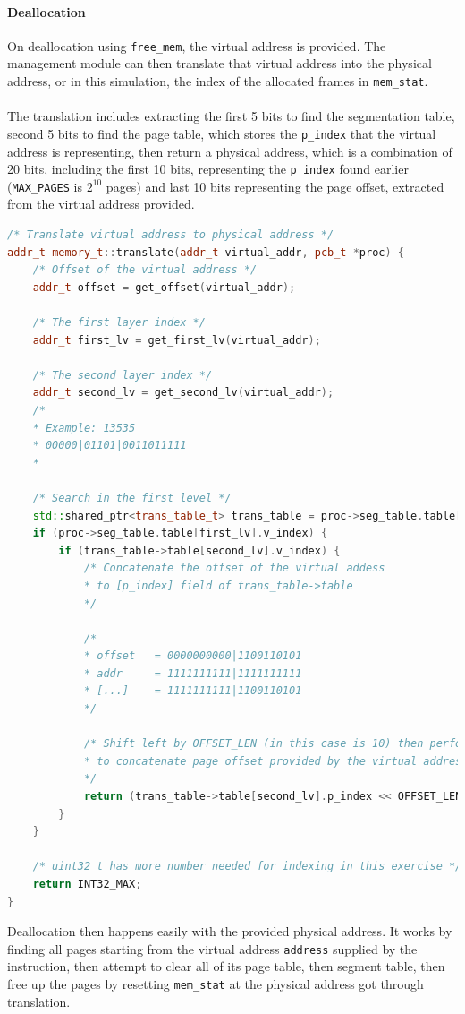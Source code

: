 \documentclass[]{article}
\begin{document}
\paragraph{Deallocation}
On deallocation using \lstinline|free_mem|, the virtual address is provided. The management module can then translate that virtual address into the physical address, or in this simulation, the index of the allocated frames in \lstinline|mem_stat|.\\
\\
The translation includes extracting the first 5 bits to find the segmentation table, second 5 bits to find the page table, which stores the \lstinline|p_index| that the virtual address is representing, then return a physical address, which is a combination of 20 bits, including the first 10 bits, representing the \lstinline|p_index| found earlier (\lstinline|MAX_PAGES| is $2^{10}$ pages) and last 10 bits representing the page offset, extracted from the virtual address provided.
\begin{lstlisting}[language=C++]
/* Translate virtual address to physical address */
addr_t memory_t::translate(addr_t virtual_addr, pcb_t *proc) {
	/* Offset of the virtual address */
	addr_t offset = get_offset(virtual_addr);
	
	/* The first layer index */
	addr_t first_lv = get_first_lv(virtual_addr);
	
	/* The second layer index */
	addr_t second_lv = get_second_lv(virtual_addr);
	/*
	* Example: 13535
	* 00000|01101|0011011111
	*
	
	/* Search in the first level */
	std::shared_ptr<trans_table_t> trans_table = proc->seg_table.table[first_lv].pages;
	if (proc->seg_table.table[first_lv].v_index) {
		if (trans_table->table[second_lv].v_index) {
			/* Concatenate the offset of the virtual addess
			* to [p_index] field of trans_table->table
			*/
			
			/*
			* offset   = 0000000000|1100110101
			* addr     = 1111111111|1111111111
			* [...]    = 1111111111|1100110101
			*/
			
			/* Shift left by OFFSET_LEN (in this case is 10) then perform bitwise OR with offset
			* to concatenate page offset provided by the virtual address
			*/
			return (trans_table->table[second_lv].p_index << OFFSET_LEN | offset);
		}
	}
	
	/* uint32_t has more number needed for indexing in this exercise */
	return INT32_MAX;
}
\end{lstlisting}
Deallocation then happens easily with the provided physical address. It works by finding all pages starting from the virtual address \lstinline|address| supplied by the instruction, then attempt to clear all of its page table, then segment table, then free up the pages by resetting \lstinline|mem_stat| at the physical address got through translation.
\end{document}
